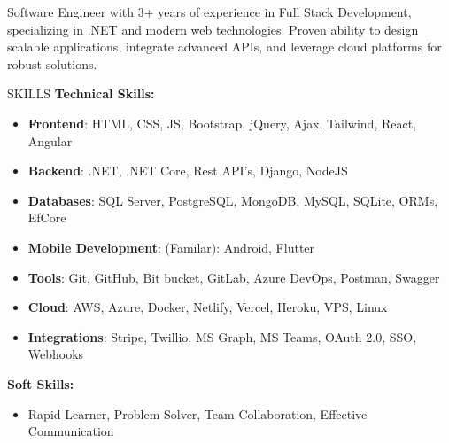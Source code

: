 \documentclass{resume} %
\begin{document}
  


\begin{rSection}%

{Software Engineer with 3+ years of experience in Full Stack Development, specializing in .NET and modern web technologies. Proven ability to design scalable applications, integrate advanced APIs, and leverage cloud platforms for robust solutions. %
}


\end{rSection}


\begin{rSection}{SKILLS}
\textbf{Technical Skills:}
\begin{itemize}
	\item \textbf{Frontend}: HTML, CSS, JS, Bootstrap, jQuery, Ajax, Tailwind, React, Angular
	\item \textbf{Backend}:  .NET, .NET Core, Rest API's, Django, NodeJS
	\item \textbf{Databases}: SQL Server, PostgreSQL, MongoDB, MySQL, SQLite, ORMs, EfCore
	\item \textbf{Mobile Development}: (Familar): Android, Flutter
	\item \textbf{Tools}: Git, GitHub, Bit bucket, GitLab, Azure DevOps, Postman, Swagger
	\item \textbf{Cloud}: AWS, Azure, Docker, Netlify, Vercel, Heroku, VPS, Linux
	\item \textbf{Integrations}: Stripe, Twillio, MS Graph, MS Teams, OAuth 2.0, SSO, Webhooks
	
\end{itemize}


\textbf{Soft Skills:} 
\begin{itemize}
\item Rapid Learner, Problem Solver, Team Collaboration, Effective Communication
\end{itemize}


\end{rSection}
\end{document}
